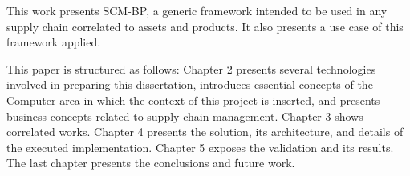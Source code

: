 This work presents \acf{SCM-BP}, a generic framework intended to be used in any supply chain correlated to assets and products. It also presents a use case of this framework applied.

This paper is structured as follows: Chapter 2 presents several technologies involved in preparing this dissertation, introduces essential concepts of the Computer area in which the context of this project is inserted, and presents business concepts related to supply chain management. Chapter 3 shows correlated works. Chapter 4 presents the solution, its architecture, and details of the executed implementation. Chapter 5 exposes the validation and its results. The last chapter presents the conclusions and future work.